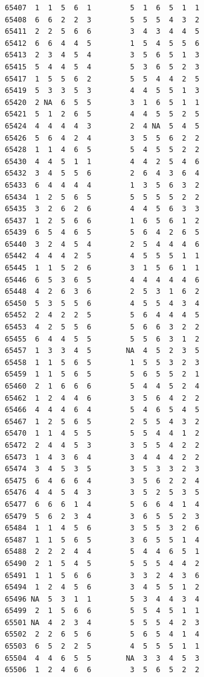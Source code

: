 \documentclass[
  letterpaper,
  DIV=11,
  numbers=noendperiod]{scrreprt}
\begin{document}
\begin{verbatim}
65407  1  1  5  6  1         5  1  6  5  1  1
65408  6  6  2  2  3         5  5  5  4  3  2
65411  2  2  5  6  6         3  4  3  4  4  5
65412  6  6  4  4  5         1  5  4  5  5  6
65413  2  3  4  5  4         3  5  6  5  1  3
65415  5  4  4  5  4         5  3  6  5  2  3
65417  1  5  5  6  2         5  5  4  4  2  5
65419  5  3  3  5  3         4  4  5  5  1  3
65420  2 NA  6  5  5         3  1  6  5  1  1
65421  5  1  2  6  5         4  4  5  5  2  5
65424  4  4  4  4  3         2  4 NA  5  4  5
65426  5  6  4  2  4         3  5  5  6  2  2
65428  1  1  4  6  5         5  4  5  5  2  2
65430  4  4  5  1  1         4  4  2  5  4  6
65432  3  4  5  5  6         2  6  4  3  6  4
65433  6  4  4  4  4         1  3  5  6  3  2
65434  1  2  5  6  5         5  5  5  5  2  2
65435  3  2  6  2  6         4  4  5  6  3  3
65437  1  2  5  6  6         1  6  5  6  1  2
65439  6  5  4  6  5         5  6  4  2  6  5
65440  3  2  4  5  4         2  5  4  4  4  6
65442  4  4  4  2  5         4  5  5  5  1  1
65445  1  1  5  2  6         3  1  5  6  1  1
65446  6  5  3  6  5         4  4  4  4  4  6
65448  4  2  6  3  6         2  5  3  1  6  2
65450  5  3  5  5  6         4  5  5  4  3  4
65452  2  4  2  2  5         5  6  4  4  4  5
65453  4  2  5  5  6         5  6  6  3  2  2
65455  6  4  4  5  5         5  5  6  3  1  2
65457  1  3  3  4  5        NA  4  5  2  3  5
65458  1  1  5  6  5         1  5  5  3  2  3
65459  1  1  5  6  5         5  6  5  5  2  1
65460  2  1  6  6  6         5  4  4  5  2  4
65462  1  2  4  4  6         3  5  6  4  2  2
65466  4  4  4  6  4         5  4  6  5  4  5
65467  1  2  5  6  5         2  5  5  4  3  2
65470  1  1  4  5  5         5  5  4  4  1  2
65472  2  4  4  5  3         3  5  5  4  2  2
65473  1  4  3  6  4         3  4  4  4  2  2
65474  3  4  5  3  5         3  5  3  3  2  3
65475  6  4  6  6  4         3  5  6  2  2  4
65476  4  4  5  4  3         3  5  2  5  3  5
65477  6  6  6  1  4         5  6  6  4  1  4
65479  5  6  2  3  4         3  6  5  5  2  3
65484  1  1  4  5  6         3  5  5  3  2  6
65487  1  1  5  6  5         3  6  5  5  1  4
65488  2  2  2  4  4         5  4  4  6  5  1
65490  2  1  5  4  5         5  5  5  4  4  2
65491  1  1  5  6  6         3  3  2  4  3  6
65494  1  2  4  5  6         3  4  5  5  1  2
65496 NA  5  3  1  1         5  3  4  4  3  4
65499  2  1  5  6  6         5  5  4  5  1  1
65501 NA  4  2  3  4         5  5  5  4  2  3
65502  2  2  6  5  6         5  6  5  4  1  4
65503  6  5  2  2  5         4  5  5  5  1  1
65504  4  4  6  5  5        NA  3  3  4  5  3
65506  1  2  4  6  6         3  5  6  5  2  2

\end{verbatim}
\end{document}
